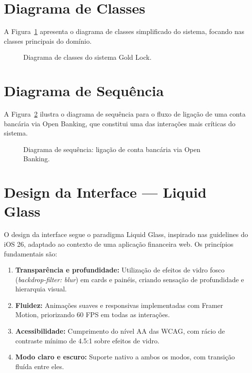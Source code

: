 \section{Diagrama de Classes}
\label{sec:arq-classes}

A Figura~\ref{fig:diagrama-classes} apresenta o diagrama de classes simplificado do sistema, focando nas classes principais do domínio.

\begin{figure}[H]
\centering

\caption{Diagrama de classes do sistema Gold Lock.}
\label{fig:diagrama-classes}
\end{figure}


\section{Diagrama de Sequência}
\label{sec:arq-sequencia}

A Figura~\ref{fig:sequencia-openbanking} ilustra o diagrama de sequência para o fluxo de ligação de uma conta bancária via Open Banking, que constitui uma das interações mais críticas do sistema.

\begin{figure}[H]
\centering

\caption{Diagrama de sequência: ligação de conta bancária via Open Banking.}
\label{fig:sequencia-openbanking}
\end{figure}


\section{Design da Interface --- Liquid Glass}
\label{sec:arq-design}

O design da interface segue o paradigma Liquid Glass, inspirado nas guidelines do iOS 26, adaptado ao contexto de uma aplicação financeira web. Os princípios fundamentais são:

\begin{enumerate}
    \item \textbf{Transparência e profundidade:} Utilização de efeitos de vidro fosco (\textit{backdrop-filter: blur}) em cards e painéis, criando sensação de profundidade e hierarquia visual.
    \item \textbf{Fluidez:} Animações suaves e responsivas implementadas com Framer Motion, priorizando 60 FPS em todas as interações.
    \item \textbf{Acessibilidade:} Cumprimento do nível AA das \ac{WCAG}, com rácio de contraste mínimo de 4.5:1 sobre efeitos de vidro.
    \item \textbf{Modo claro e escuro:} Suporte nativo a ambos os modos, com transição fluída entre eles.
\end{enumerate}

